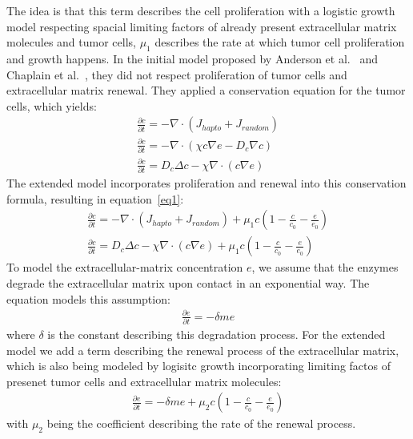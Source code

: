 The idea is that this term describes the cell proliferation with a logistic growth model respecting spacial limiting factors of already present extracellular matrix molecules and tumor cells, $\mu_1$ describes the rate at which tumor cell proliferation and growth happens. In the initial model proposed by Anderson et al.~\cite{anderson_continuous_1998, anderson_mathematical_2000} and Chaplain et al.~\cite{anderson_continuous_1998,chaplain_mathematical_2006,franssen_mathematical_2019}, they did not respect proliferation of tumor cells and extracellular matrix renewal. They applied a conservation equation for the tumor cells, which yields:
\begin{align*}
    \frac{\partial c}{\partial t} = -\nabla \cdot (J_{hapto} + J_{random}) \\
    \frac{\partial c}{\partial t} = -\nabla \cdot (\chi c \nabla e -D_c \nabla c ) \\
    \frac{\partial c}{\partial t} = D_c \Delta c - \chi \nabla \cdot (c\nabla e)
\end{align*}
The extended model incorporates proliferation and renewal into this conservation formula, resulting in equation~\ref{eq1}:
\begin{align*}
    \frac{\partial c}{\partial t} = -\nabla \cdot (J_{hapto} + J_{random}) + \mu_1 c (1-\frac{c}{c_0} - \frac{e}{e_0}) \\
    \frac{\partial c}{\partial t} = D_c \Delta c - \chi \nabla \cdot (c\nabla e) + \mu_1 c (1-\frac{c}{c_0} - \frac{e}{e_0})
\end{align*}
To model the extracellular-matrix concentration $e$, we assume that the enzymes degrade the extracellular matrix upon contact in an exponential way. The equation models this assumption:
\begin{align*}
    \frac{\partial e}{\partial t} = -\delta m e
\end{align*}
where $\delta$ is the constant describing this degradation process. For the extended model we add a term describing the renewal process of the extracellular matrix, which is also being modeled by logisitc growth incorporating limiting factos of presenet tumor cells and extracellular matrix molecules:
\begin{align*}
    \frac{\partial e}{\partial t} = -\delta m e + \mu_2 c (1 - \frac{c}{c_0} - \frac{e}{e_0})
\end{align*}
with $\mu_2$ being the coefficient describing the rate of the renewal process.

